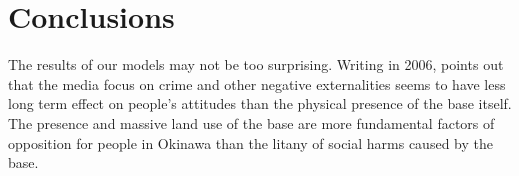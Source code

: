 \section*{Conclusions}

The results of our models may not be too surprising. Writing in 2006,  points out that the media focus on crime and other negative externalities seems to have less long term effect on people's attitudes than the physical presence of the base itself. The presence and massive land use of the base are more fundamental factors of opposition for people in Okinawa than the litany of social harms caused by the base.